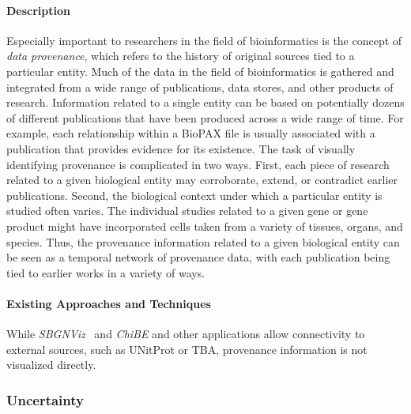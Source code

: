 \paragraph*{Description}
Especially important to researchers in the field of bioinformatics is the concept of \textit{data provenance}, which refers to the history of original sources tied to a particular entity.
Much of the data in the field of bioinformatics is gathered and integrated from a wide range of publications, data stores, and other products of research.
Information related to a single entity can be based on potentially dozens of different publications that have been produced across a wide range of time.
For example, each relationship within a BioPAX file is usually associated with a publication that provides evidence for its existence.
The task of visually identifying provenance is complicated in two ways.
First, each piece of research related to a given biological entity may corroborate, extend, or contradict earlier publications.
Second, the biological context under which a particular entity is studied often varies.
The individual studies related to a given gene or gene product might have incorporated cells taken from a variety of tissues, organs, and species.
Thus, the provenance information related to a given biological entity can be seen as a temporal network of provenance data, with each publication being tied to earlier works in a variety of ways.

\paragraph*{Existing Approaches and Techniques}
While \textit{SBGNViz}~\cite{SBGNViz2015} and \textit{ChiBE}\cite{Babur2010chibe} and other applications allow connectivity to external sources, such as UNitProt or TBA, provenance information is not visualized directly.


\subsubsection*{Uncertainty}

